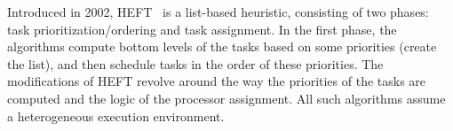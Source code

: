 \documentclass[conference]{IEEEtran}
\newcommand{\skug}[1]{{\color{blue}[SK: #1]}}
\newcommand{\hmey}[1]{{\color{red}[HM: #1]}}
\begin{document}
%
%
%


%
Introduced in 2002, HEFT~\cite{topcuoglu2002performance} is a list-based heuristic, consisting 
of two phases: task prio\-ri\-tization/ordering and task assignment.
In the first phase, the algorithms compute bottom levels of the tasks based on some priorities (create the list),
and then schedule tasks in the order of these priorities.
The modifications of HEFT revolve around the way the priorities of the tasks are computed and the logic of the processor assignment.
All such algorithms assume a heterogeneous execution environment.
\end{document}
